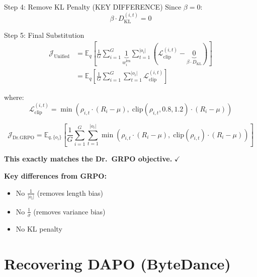 \documentclass[11pt,a4paper]{article}
\begin{document}
\begin{proofbox}{Step 4: Remove KL Penalty (KEY DIFFERENCE)}
Since $\beta = 0$:
\begin{equation}
\beta \cdot D_{\text{KL}}^{(i,t)} = 0
\end{equation}
\end{proofbox}

\begin{proofbox}{Step 5: Final Substitution}
\begin{align}
\mathcal{J}_{\text{Unified}} &= \mathbb{E}_{q} \left[ \frac{1}{G} \sum_{i=1}^{G} \underbrace{1}_{w_i^{\text{len}}} \sum_{t=1}^{|o_i|} \left( \mathcal{L}_{\text{clip}}^{(i,t)} - \underbrace{0}_{\beta \cdot D_{\text{KL}}} \right) \right] \\[10pt]
&= \mathbb{E}_{q} \left[ \frac{1}{G} \sum_{i=1}^{G} \sum_{t=1}^{|o_i|} \mathcal{L}_{\text{clip}}^{(i,t)} \right]
\end{align}

where:
\begin{equation}
\mathcal{L}_{\text{clip}}^{(i,t)} = \min\left( \rho_{i,t} \cdot (R_i - \mu), \; \text{clip}(\rho_{i,t}, 0.8, 1.2) \cdot (R_i - \mu) \right)
\end{equation}
\end{proofbox}

\begin{resultbox}
\begin{equation}
\mathcal{J}_{\text{Dr.GRPO}} = \mathbb{E}_{q, \{o_i\}} \left[ \frac{1}{G} \sum_{i=1}^{G} \sum_{t=1}^{|o_i|} \min\left( \rho_{i,t} \cdot (R_i - \mu), \; \text{clip}(\rho_{i,t}) \cdot (R_i - \mu) \right) \right]
\end{equation}

\textbf{This exactly matches the Dr.~GRPO objective.} $\checkmark$

\textbf{Key differences from GRPO:}
\begin{itemize}
    \item No $\frac{1}{|o_i|}$ (removes length bias)
    \item No $\frac{1}{\sigma}$ (removes variance bias)
    \item No KL penalty
\end{itemize}
\end{resultbox}

\newpage

\section{Recovering DAPO (ByteDance)}
\end{document}
